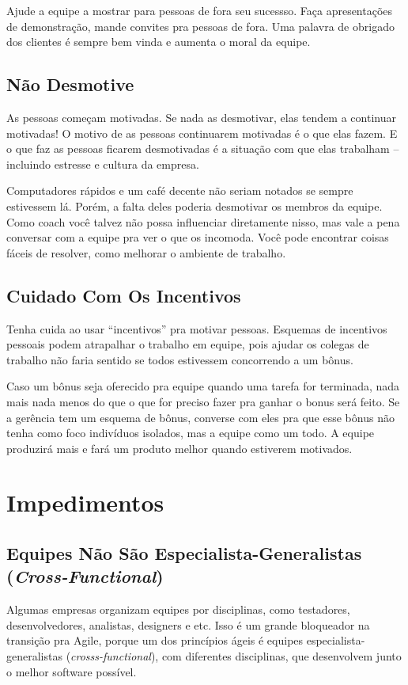 \documentclass[a4paper, 10pt, font=plain]{abnt}
\begin{document}
Ajude a equipe a mostrar para pessoas de fora seu sucessso. Faça apresentações de demonstração, mande convites pra pessoas de fora. Uma palavra de obrigado dos clientes é sempre bem vinda e aumenta o moral da equipe.


\subsection{Não Desmotive}
As pessoas começam motivadas. Se nada as desmotivar, elas tendem a continuar motivadas! O motivo de as pessoas continuarem motivadas é o que elas fazem. E o que faz as pessoas ficarem desmotivadas é a situação com que elas trabalham -- incluindo estresse e cultura da empresa.

Computadores rápidos e um café decente não seriam notados se sempre estivessem lá. Porém, a falta deles poderia desmotivar os membros da equipe. Como coach você talvez não possa influenciar diretamente nisso, mas vale a pena conversar com a equipe pra ver o que os incomoda. Você pode encontrar coisas fáceis de resolver, como melhorar o ambiente de trabalho.


\subsection{Cuidado Com Os Incentivos}
Tenha cuida ao usar ``incentivos'' pra motivar pessoas. Esquemas de incentivos pessoais podem atrapalhar o trabalho em equipe, pois ajudar os colegas de trabalho não faria sentido se todos estivessem concorrendo a um bônus.

Caso um bônus seja oferecido pra equipe quando uma tarefa for terminada, nada mais nada menos do que o que for preciso fazer pra ganhar o bonus será feito. Se a gerência tem um esquema de bônus, converse com eles pra que esse bônus não tenha como foco indivíduos isolados, mas a equipe como um todo. A equipe produzirá mais e fará um produto melhor quando estiverem motivados.



\section{Impedimentos}

\subsection{Equipes Não São Especialista-Generalistas (\textit{Cross-Functional})}
Algumas empresas organizam equipes por disciplinas, como testadores, desenvolvedores, analistas, designers e etc. Isso é um grande bloqueador na transição pra Agile, porque um dos princípios ágeis é equipes especialista-generalistas (\textit{crosss-functional}), com diferentes disciplinas, que desenvolvem junto o melhor software possível.
\end{document}
